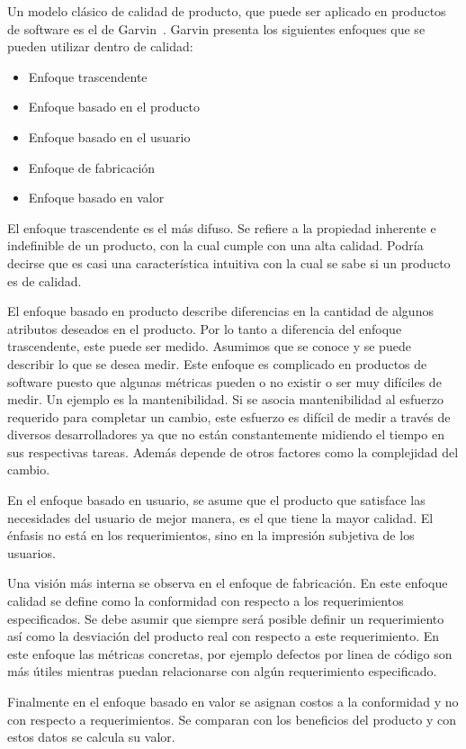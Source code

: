 Un modelo clásico de calidad de producto, que puede ser aplicado en productos
de software es el de Garvin~\cite{Garvin:1984}. Garvin presenta los siguientes
enfoques que se pueden utilizar dentro de calidad:
\begin{itemize}
    \item Enfoque trascendente
    \item Enfoque basado en el producto
    \item Enfoque basado en el usuario
    \item Enfoque de fabricación
    \item Enfoque basado en valor
\end{itemize}

El enfoque trascendente es el más difuso. Se refiere a la propiedad inherente
e indefinible de un producto, con la cual cumple con una alta calidad. Podría
decirse que es casi una característica intuitiva con la cual se sabe si un
producto es de calidad.

El enfoque basado en producto describe diferencias en la cantidad de algunos
atributos deseados en el producto. Por lo tanto a diferencia del enfoque
trascendente, este puede ser medido. Asumimos que se conoce y se puede 
describir lo que se desea medir.
Este enfoque es complicado en productos de software puesto que algunas métricas
pueden o no existir o ser muy difíciles de medir. Un ejemplo es la mantenibilidad.
Si se asocia mantenibilidad al esfuerzo requerido para completar un cambio, este
esfuerzo es difícil de medir a través de diversos desarrolladores ya que no están
constantemente midiendo el tiempo en sus respectivas tareas. Además depende de 
otros factores como la complejidad del cambio.

En el enfoque basado en usuario, se asume que el producto que satisface
las necesidades del usuario de mejor manera, es el que tiene la mayor calidad. El énfasis
no está en los requerimientos, sino en la impresión subjetiva de los usuarios.

Una visión más interna se observa en el enfoque de fabricación. En este enfoque
calidad se define como la conformidad con respecto a los requerimientos especificados.
Se debe asumir que siempre será posible definir un requerimiento así como la desviación
del producto real con respecto a este requerimiento. En este enfoque las métricas
concretas, por ejemplo defectos por linea de código son más útiles mientras puedan
relacionarse con algún requerimiento especificado.

Finalmente en el enfoque basado en valor se asignan costos a la conformidad y no
con respecto a requerimientos. Se comparan con los beneficios del
producto y con estos datos se calcula su valor.

